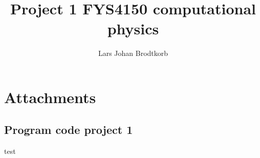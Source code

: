 \documentclass[10pt,a4paper]{article}
\begin{document}
\title{Project 1 FYS4150 computational physics}
\author{Lars Johan Brodtkorb}
\maketitle


\tableofcontents
\newpage




\section{Attachments}
\subsection{Program code project 1}
\label{sec:programcode_1}


%

test
\end{document}
